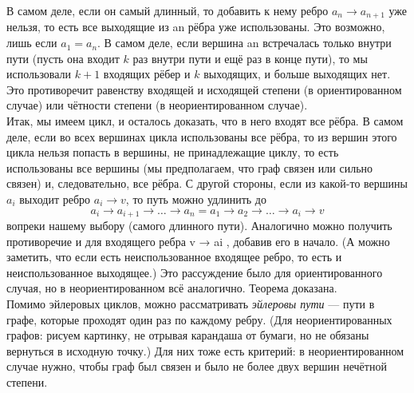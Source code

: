 В самом деле, если он самый длинный, то добавить к нему ребро $a_n \to a_{n +1}$
уже нельзя, то есть все выходящие из an рёбра уже использованы. Это возможно,
лишь если $a_1 = a_n$. В самом деле, если вершина an встречалась только внутри пути
(пусть она входит $k$ раз внутри пути и ещё раз в конце пути), то мы использовали
$k + 1$ входящих рёбер и $k$ выходящих, и больше выходящих нет. Это противоречит
равенству входящей и исходящей степени (в ориентированном случае) или чётности
степени (в неориентированном случае). \\ 

Итак, мы имеем цикл, и осталось доказать, что в него входят все рёбра. В самом
деле, если во всех вершинах цикла использованы все рёбра, то из вершин этого цикла
нельзя попасть в вершины, не принадлежащие циклу, то есть использованы все
вершины (мы предполагаем, что граф связен или сильно связен) и, следовательно,
все рёбра. С другой стороны, если из какой-то вершины $a_i$ выходит ребро $a_i \to v$,
то путь можно удлинить до 
\[
a_i \to a_{i + 1} \to \dots \to a_n = a_1 \to a_2 \to \dots \to a_i \to v
\]
вопреки нашему выбору (самого длинного пути). Аналогично можно получить противоречие и для входящего ребра v → ai
, добавив его в начало. (А можно заметить,
что если есть неиспользованное входящее ребро, то есть и неиспользованное выходящее.) Это рассуждение было для ориентированного случая, но в неориентированном
всё аналогично. Теорема доказана. \\

Помимо эйлеровых циклов, можно рассматривать \textit{эйлеровы пути} — пути в графе, которые проходят один раз по каждому ребру. (Для неориентированных графов:
рисуем картинку, не отрывая карандаша от бумаги, но не обязаны вернуться в исходную точку.) Для них тоже есть критерий: в неориентированном случае нужно,
чтобы граф был связен и было не более двух вершин нечётной степени.